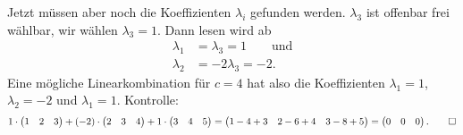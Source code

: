 \begin{loesung}
Jetzt müssen aber noch die Koeffizienten $\lambda_i$ gefunden werden.
$\lambda_3$ ist offenbar frei wählbar, wir wählen $\lambda_3=1$.
Dann lesen wird ab
\begin{align*}
\lambda_1 &= \lambda_3=1\qquad\text{und}\\
\lambda_2 &= -2\lambda_3=-2.
\end{align*}
Eine mögliche Linearkombination für $c=4$ hat also die Koeffizienten
$\lambda_1=1$,
$\lambda_2=-2$
und
$\lambda_1=1$.
Kontrolle:
\[
1\cdot\begin{pmatrix}1&2&3\end{pmatrix}
+
(-2)\cdot \begin{pmatrix}2&3&4\end{pmatrix}
+
1\cdot\begin{pmatrix}3&4&5\end{pmatrix}
=
\begin{pmatrix}
1-4+3& 2-6+4&3-8+5
\end{pmatrix}
=
\begin{pmatrix}0&0&0\end{pmatrix}.
\qedhere
\]
\end{loesung}


